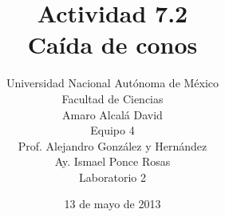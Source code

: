 \documentclass[12pt,a4paper]{article}
\date{13 de mayo de 2013}
\title{Actividad 7.2\\
    Caída de conos\\
}
\author{Universidad Nacional Autónoma de México \\
    Facultad de Ciencias \\
    Amaro Alcalá David \\
    Equipo 4 \\
    Prof. Alejandro González y Hernández\\
    Ay. Ismael Ponce Rosas\\
    Laboratorio 2\\
    }
\begin{document}
        
    \begin{multicols}{2}
        
        
        
        
        
    \end{multicols}
        
        
        
    \begin{multicols}{2}
        
        
        
    \end{multicols}
\end{document}
